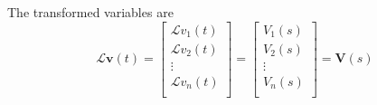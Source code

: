 The transformed variables are
\begin{displaymath}
  \mathcal{L}\mathbf{v}(t) = \left[
  \begin{array}{c}
   \mathcal{L} v_1(t) \\
   \mathcal{L} v_2(t) \\
    \vdots \\
   \mathcal{L} v_n(t) \\
  \end{array}
  \right] = \left[
  \begin{array}{c}
   V_1(s) \\
   V_2(s) \\
    \vdots \\
   V_n(s) \\
  \end{array}
  \right] = \mathbf{V}(s)
\end{displaymath}

\endinput

